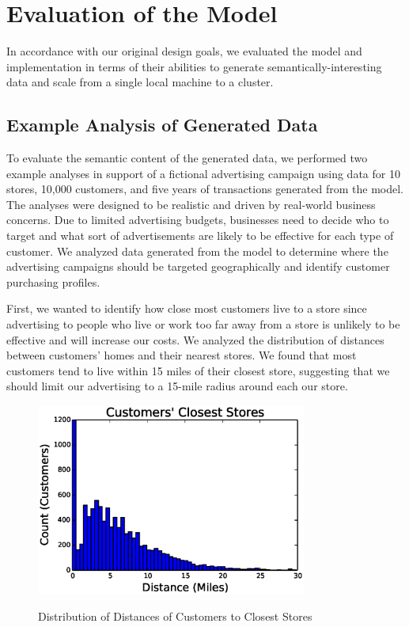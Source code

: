 \section{Evaluation of the Model}
In accordance with our original design goals, we evaluated the model and implementation in terms of their abilities to generate semantically-interesting data and scale from a single local machine to a cluster.

\subsection{Example Analysis of Generated Data}
To evaluate the semantic content of the generated data, we performed two example analyses in support of a fictional advertising campaign using data for 10 stores, 10,000 customers, and five years of transactions generated from the model. The analyses were designed to be realistic and driven by real-world business concerns.  Due to limited advertising budgets, businesses need to decide who to target and what sort of advertisements are likely to be effective for each type of customer.  We analyzed data generated from the model to determine where the advertising campaigns should be targeted geographically and identify customer purchasing profiles.

First, we wanted to identify how close most customers live to a store since advertising to people who live or work too far away from a store is unlikely to be effective and will increase our costs. We analyzed the distribution of distances between customers' homes and their nearest stores.  We found that most customers tend to live within 15 miles of their closest store, suggesting that we should limit our advertising to a 15-mile radius around each our store.

\begin{figure}[!t]
  \centering
  \caption{Distribution of Distances of Customers to Closest Stores}
  \includegraphics[width=3.5in]{figures/bigpetstore/customer_store_distances.eps}
  \label{fig:cluster_analysis}
\end{figure}

